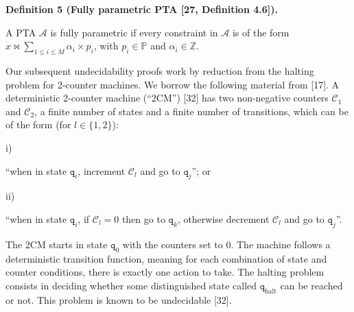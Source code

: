 \documentclass[10pt,a4paper]{article}
\begin{document}
 
 
\par\medskip\noindent\textbf{Definition 5 (Fully parametric PTA [27, Definition 4.6]).}\par
 
 
A PTA $\mathcal{A}$ is fully parametric if every constraint in $\mathcal{A}$ is of the form $x\bowtie\sum_{1\leq i\leq M}\alpha_{i}\times p_{i}$, with $p_{i}\in\mathbb{P}$ and $\alpha_{i}\in\mathbb{Z}$.\par
 
 
 
 
Our subsequent undecidability proofs work by reduction from the halting problem for 2-counter machines. We borrow the following material from [17]. A deterministic 2-counter machine (“2CM”) [32] has two non-negative counters $\mathcal{C}_{1}$ and $\mathcal{C}_{2}$, a finite number of states and a finite number of transitions, which can be of the form (for $l\in\{1,2\}$):\par
  
\par\noindent  i) 
 
“when in state $\mathtt{q}_{i}$, increment $\mathcal{C}_{l}$ and go to $\mathtt{q}_{j}$”; or\par
 
 
 
\par\noindent  ii) 
 
“when in state $\mathtt{q}_{i}$, if $\mathcal{C}_{l}=0$ then go to $\mathtt{q}_{k}$, otherwise decrement $\mathcal{C}_{l}$ and go to $\mathtt{q}_{j}$”.\par
 
 
  
 
 
The 2CM starts in state $\mathtt{q}_{0}$ with the counters set to 0. The machine follows a deterministic transition function, meaning for each combination of state and counter conditions, there is exactly one action to take. The halting problem consists in deciding whether some distinguished state called $\mathtt{q}_{\textrm{halt}}$ can be reached or not. This problem is known to be undecidable [32].\par
 
\end{document}
